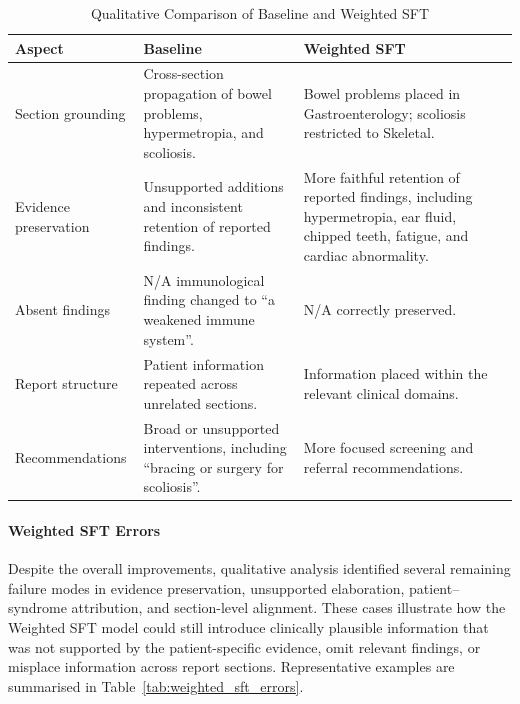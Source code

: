 \documentclass[ %
                    author={Aman Kumar Singh},
                supervisor={Dr. Edwin Simpson},
                    degree={MSc},
                     title={Quality-Aware Knowledge Distillation of Large Language Models for Efficient Personalised Clinical Report Generation},
                  subtitle={},
                      type={},
                      year={2021}]{dissertation}
\begin{document}
\vspace{-8pt}
\begin{table}[H]
\centering
\scriptsize
\caption{Qualitative Comparison of Baseline and Weighted SFT}
\label{tab:baseline_weighted_qualitative}
\begin{tabular}{p{} p{} p{}}
\hline
\textbf{Aspect} & \textbf{Baseline} & \textbf{Weighted SFT} \\
\hline

Section grounding
&
Cross-section propagation of bowel problems, hypermetropia, and scoliosis.
&
Bowel problems placed in Gastroenterology; scoliosis restricted to Skeletal.
\\

Evidence preservation
&
Unsupported additions and inconsistent retention of reported findings.
&
More faithful retention of reported findings, including hypermetropia, ear
fluid, chipped teeth, fatigue, and cardiac abnormality.
\\

Absent findings
&
N/A immunological finding changed to ``a weakened immune system''.
&
N/A correctly preserved.
\\

Report structure
&
Patient information repeated across unrelated sections.
&
Information placed within the relevant clinical domains.
\\

Recommendations
&
Broad or unsupported interventions, including ``bracing or surgery for
scoliosis''.
&
More focused screening and referral recommendations.
\\

\hline
\end{tabular}
\end{table}
\vspace{-8pt}
\paragraph{Weighted SFT Errors}



Despite the overall improvements, qualitative analysis identified several
remaining failure modes in evidence preservation, unsupported elaboration,
patient--syndrome attribution, and section-level alignment. These cases
illustrate how the Weighted SFT model could still introduce clinically
plausible information that was not supported by the patient-specific evidence,
omit relevant findings, or misplace information across report sections.
Representative examples are summarised in Table~\ref{tab:weighted_sft_errors}.
\end{document}
